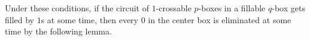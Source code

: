 \documentclass{article}
\newcommand{\bZ}{{\mathbb Z}}
\numberwithin{equation}{section}
\newtheorem{lemma}[theorem]{Lemma}
\begin{document}
Under these conditions, if the circuit of $1$-crossable $p$-boxes in a fillable $q$-box gets filled by $1$s at some time, then every $0$ in the center box is eliminated at some time by the following lemma.




\end{document}
